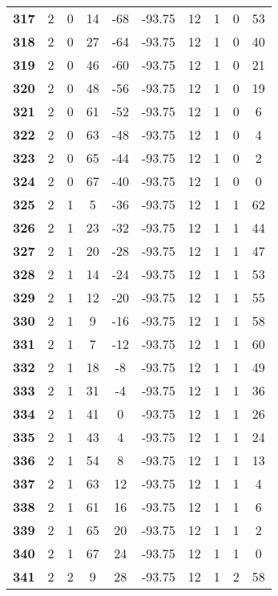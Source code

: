 \documentclass[12pt,letterpaper, onecolumn]{exam}
\begin{document}
\begin{longtable}{cccccccccc}
    \textbf{317} & 2 & 0 & 14 & -68 & -93.75 & 12 & 1 & 0 & 53 \\ 
    \textbf{318} & 2 & 0 & 27 & -64 & -93.75 & 12 & 1 & 0 & 40 \\ 
    \textbf{319} & 2 & 0 & 46 & -60 & -93.75 & 12 & 1 & 0 & 21 \\      \hline
    \textbf{320} & 2 & 0 & 48 & -56 & -93.75 & 12 & 1 & 0 & 19 \\
    \textbf{321} & 2 & 0 & 61 & -52 & -93.75 & 12 & 1 & 0 & 6 \\ 
    \textbf{322} & 2 & 0 & 63 & -48 & -93.75 & 12 & 1 & 0 & 4 \\ 
    \textbf{323} & 2 & 0 & 65 & -44 & -93.75 & 12 & 1 & 0 & 2 \\ 
    \textbf{324} & 2 & 0 & 67 & -40 & -93.75 & 12 & 1 & 0 & 0 \\ 
    \textbf{325} & 2 & 1 & 5 & -36 & -93.75 & 12 & 1 & 1 & 62 \\ 
    \textbf{326} & 2 & 1 & 23 & -32 & -93.75 & 12 & 1 & 1 & 44 \\ 
    \textbf{327} & 2 & 1 & 20 & -28 & -93.75 & 12 & 1 & 1 & 47 \\ 
    \textbf{328} & 2 & 1 & 14 & -24 & -93.75 & 12 & 1 & 1 & 53 \\ 
    \textbf{329} & 2 & 1 & 12 & -20 & -93.75 & 12 & 1 & 1 & 55 \\ 
    \textbf{330} & 2 & 1 & 9 & -16 & -93.75 & 12 & 1 & 1 & 58 \\ 
    \textbf{331} & 2 & 1 & 7 & -12 & -93.75 & 12 & 1 & 1 & 60 \\ 
    \textbf{332} & 2 & 1 & 18 & -8 & -93.75 & 12 & 1 & 1 & 49 \\ 
    \textbf{333} & 2 & 1 & 31 & -4 & -93.75 & 12 & 1 & 1 & 36 \\ 
    \textbf{334} & 2 & 1 & 41 & 0 & -93.75 & 12 & 1 & 1 & 26 \\ 
    \textbf{335} & 2 & 1 & 43 & 4 & -93.75 & 12 & 1 & 1 & 24 \\ 
    \textbf{336} & 2 & 1 & 54 & 8 & -93.75 & 12 & 1 & 1 & 13 \\ 
    \textbf{337} & 2 & 1 & 63 & 12 & -93.75 & 12 & 1 & 1 & 4 \\ 
    \textbf{338} & 2 & 1 & 61 & 16 & -93.75 & 12 & 1 & 1 & 6 \\ 
    \textbf{339} & 2 & 1 & 65 & 20 & -93.75 & 12 & 1 & 1 & 2 \\ 
    \textbf{340} & 2 & 1 & 67 & 24 & -93.75 & 12 & 1 & 1 & 0 \\ 
    \textbf{341} & 2 & 2 & 9 & 28 & -93.75 & 12 & 1 & 2 & 58 \\ 

\end{longtable}
\end{document}
